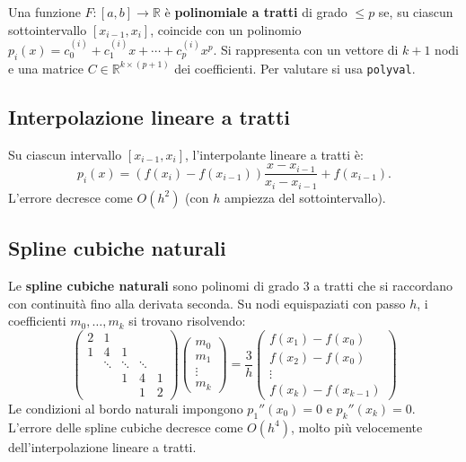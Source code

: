 \documentclass[12pt,a4paper,]{report}
\begin{document}
Una funzione $F: [a,b] \to \mathbb{R}$ è \textbf{polinomiale a tratti} di grado
$\leq p$ se, su ciascun sottointervallo $[x_{i-1}, x_i]$, coincide con un
polinomio $p_i(x) = c_0^{(i)} + c_1^{(i)} x + \cdots + c_p^{(i)} x^p$.
Si rappresenta con un vettore di $k+1$ nodi e una matrice $C \in \mathbb{R}^{k \times (p+1)}$
dei coefficienti. Per valutare si usa \texttt{polyval}.

\subsection{Interpolazione lineare a tratti}

Su ciascun intervallo $[x_{i-1}, x_i]$, l'interpolante lineare a tratti è:
\[
  p_i(x) = (f(x_i) - f(x_{i-1})) \frac{x - x_{i-1}}{x_i - x_{i-1}} + f(x_{i-1}).
\]
L'errore decresce come $O(h^2)$ (con $h$ ampiezza del sottointervallo).

\subsection{Spline cubiche naturali}
\label{sec: lab spline cubiche naturali}

Le \textbf{spline cubiche naturali} sono polinomi di grado 3 a tratti che si
raccordano con continuità fino alla derivata seconda. Su nodi equispaziati
con passo $h$, i coefficienti $m_0, \ldots, m_k$ si trovano risolvendo:
\[
  \begin{pmatrix}
    2 & 1 & & \\
    1 & 4 & 1 & \\
    & \ddots & \ddots & \ddots \\
    & & 1 & 4 & 1 \\
    & & & 1 & 2
  \end{pmatrix}
  \begin{pmatrix} m_0 \\ m_1 \\ \vdots \\ m_k \end{pmatrix}
  = \frac{3}{h}
  \begin{pmatrix}
    f(x_1) - f(x_0) \\
    f(x_2) - f(x_0) \\
    \vdots \\
    f(x_k) - f(x_{k-1})
  \end{pmatrix}
\]
Le condizioni al bordo naturali impongono $p_1''(x_0) = 0$ e $p_k''(x_k) = 0$.
L'errore delle spline cubiche decresce come $O(h^4)$, molto più velocemente
dell'interpolazione lineare a tratti.
\end{document}
